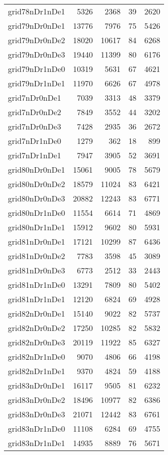 \begin{longtable}{lrrrr}
grid78nDr1nDe1 & 5326 & 2368 & 39 & 2620 \\
grid79nDr0nDe1 & 13776 & 7976 & 75 & 5426 \\
grid79nDr0nDe2 & 18020 & 10617 & 84 & 6268 \\
grid79nDr0nDe3 & 19440 & 11399 & 80 & 6176 \\
grid79nDr1nDe0 & 10319 & 5631 & 67 & 4621 \\
grid79nDr1nDe1 & 11970 & 6626 & 67 & 4978 \\
grid7nDr0nDe1 & 7039 & 3313 & 48 & 3379 \\
grid7nDr0nDe2 & 7849 & 3552 & 44 & 3202 \\
grid7nDr0nDe3 & 7428 & 2935 & 36 & 2672 \\
grid7nDr1nDe0 & 1279 & 362 & 18 & 899 \\
grid7nDr1nDe1 & 7947 & 3905 & 52 & 3691 \\
grid80nDr0nDe1 & 15061 & 9005 & 78 & 5679 \\
grid80nDr0nDe2 & 18579 & 11024 & 83 & 6421 \\
grid80nDr0nDe3 & 20882 & 12243 & 83 & 6771 \\
grid80nDr1nDe0 & 11554 & 6614 & 71 & 4869 \\
grid80nDr1nDe1 & 15912 & 9602 & 80 & 5931 \\
grid81nDr0nDe1 & 17121 & 10299 & 87 & 6436 \\
grid81nDr0nDe2 & 7783 & 3598 & 45 & 3089 \\
grid81nDr0nDe3 & 6773 & 2512 & 33 & 2443 \\
grid81nDr1nDe0 & 13291 & 7809 & 80 & 5402 \\
grid81nDr1nDe1 & 12120 & 6824 & 69 & 4928 \\
grid82nDr0nDe1 & 15140 & 9022 & 82 & 5737 \\
grid82nDr0nDe2 & 17250 & 10285 & 82 & 5832 \\
grid82nDr0nDe3 & 20119 & 11922 & 85 & 6327 \\
grid82nDr1nDe0 & 9070 & 4806 & 66 & 4198 \\
grid82nDr1nDe1 & 9370 & 4824 & 59 & 4188 \\
grid83nDr0nDe1 & 16117 & 9505 & 81 & 6232 \\
grid83nDr0nDe2 & 18496 & 10977 & 82 & 6386 \\
grid83nDr0nDe3 & 21071 & 12442 & 83 & 6761 \\
grid83nDr1nDe0 & 11108 & 6284 & 69 & 4755 \\
grid83nDr1nDe1 & 14935 & 8889 & 76 & 5671 \\

\end{longtable}
